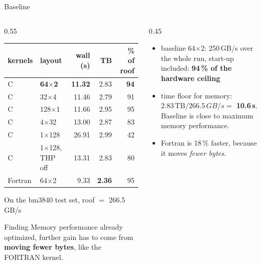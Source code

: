 \documentclass[aspectratio=169,10pt]{beamer}
\newcommand{\GBs}{\,GB/s}
\begin{document}
\begin{frame}{Baseline}
  \begin{columns}[T]
    \begin{column}{0.55\textwidth}
      \footnotesize
      \begin{tabular}{llrrr}
        \toprule
        kernels & layout & wall (s) & TB & \% of roof \\
        \midrule
        C & \textbf{64$\times$2} & \textbf{11.32} & 2.83 & \textbf{94} \\
        C & 32$\times$4  & 11.46 & 2.79 & 91 \\
        C & 128$\times$1 & 11.66 & 2.95 & 95 \\
        C & 4$\times$32  & 13.00 & 2.87 & 83 \\
        C & 1$\times$128 & 26.91 & 2.99 & 42 \\
        C & 1$\times$128, THP off & 13.31 & 2.83 & 80 \\
        \midrule
        Fortran & 64$\times$2 & 9.33 & \textbf{2.36} & 95 \\
        \bottomrule
      \end{tabular}
      \vspace{0.2cm}

      \scriptsize On the bm3840 test set, roof $=$ 266.5\GBs{}
      \vspace{0.1cm}

      \normalsize
      \begin{alertblock}{Finding}
        Memory performance already optimized, further gain has to come from \textbf{moving fewer bytes}, like the FORTRAN kernel.
      \end{alertblock}
    \end{column}
    \begin{column}{0.45\textwidth}
      \begin{itemize}
        \item baseline 64$\times$2: 250\GBs{} over the whole run, start-up included: \textbf{94\,\% of the hardware ceiling}
        \item time floor for memory: $2.83\,\text{TB} / 266.5\GBs = $ \textbf{10.6\,s}. Baseline is close to maximum memory performance.
        \item Fortran is 18\,\% faster, because it moves \emph{fewer bytes}.
      \end{itemize}
    \end{column}
  \end{columns}
\end{frame}
\end{document}
